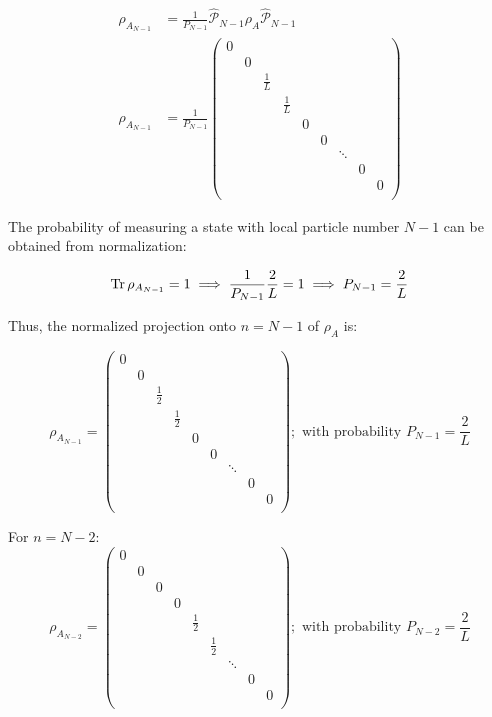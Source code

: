\begin{equation}
\begin{aligned}
\rho_{A_{N-1}} &= \frac{1}{P_{N-1}} \hat{\mathcal{P}}_{N-1} \rho_{A} \hat{\mathcal{P}}_{N-1} \\
\rho_{A_{N-1}} &= \frac{1}{P_{N-1}} \begin{pmatrix} 
0 \\
& 0 \\
& & \frac{1}{L} \\
& & & \frac{1}{L} \\
& & & &  0 \\
& & & & & 0 \\
& & & & &  & \ddots \\
& & & & & & &  0 \\
& & & & & & & &  0 \\
\end{pmatrix} 
\end{aligned}
\end{equation}

The probability of measuring a state with local particle number $N-1$ can be obtained from normalization:

\begin{equation}
\operatorname{Tr}{\rho_{A_{N-1}}} = 1 \implies \frac{1}{P_{N-1}}\frac{2}{L} = 1 \implies P_{N-1} = \frac{2}{L}
\end{equation}

Thus, the normalized projection onto $n=N-1$ of $\rho_{A}$ is:

\begin{equation}
\rho_{A_{N-1}} = \begin{pmatrix} 
0 \\
& 0 \\
& & \frac{1}{2} \\
& & & \frac{1}{2} \\
& & & &  0 \\
& & & & & 0 \\
& & & & &  & \ddots \\
& & & & & & &  0 \\
& & & & & & & &  0 \\
\end{pmatrix} ; \text{ with probability } P_{N-1} = \frac{2}{L}
\end{equation}

For $n = N-2$:
\begin{equation}
 \rho_{A_{N-2}} = \begin{pmatrix} 
0 \\
& 0 \\
& & 0  \\
& & & 0 \\
& & & &  \frac{1}{2} \\
& & & & & \frac{1}{2} \\
& & & & &  & \ddots \\
& & & & & & &  0 \\
& & & & & & & &  0 \\
\end{pmatrix} ; \text{ with probability } P_{N-2} = \frac{2}{L}
\end{equation}

